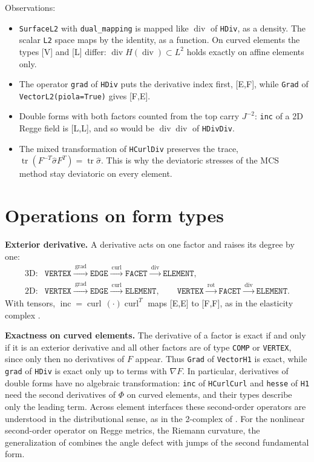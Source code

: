 \documentclass[10pt,a4paper]{article}
\newcommand{\code}[1]{\texttt{#1}}
\newcommand{\VV}{\textsf{V}}
\newcommand{\EE}{\textsf{E}}
\newcommand{\FF}{\textsf{F}}
\newcommand{\LL}{\textsf{L}}
\begin{document}
Observations:
\begin{itemize}\setlength\itemsep{1pt}
\item \code{SurfaceL2} with \code{dual\_mapping} is mapped like $\operatorname{div}$ of \code{HDiv}, as a density. The scalar \code{L2} space maps by the identity, as a function. On curved elements the types [\VV] and [\LL] differ: $\operatorname{div} H(\operatorname{div}) \subset L^2$ holds exactly on affine elements only.
\item The operator \code{grad} of \code{HDiv} puts the derivative index first, [\EE,\FF], while \code{Grad} of \code{VectorL2(piola=True)} gives [\FF,\EE].
\item Double forms with both factors counted from the top carry $J^{-2}$: \code{inc} of a 2D Regge field is [\LL,\LL], and so would be $\operatorname{div}\operatorname{div}$ of \code{HDivDiv}.
\item The mixed transformation of \code{HCurlDiv} preserves the trace, $\operatorname{tr}(F^{-T}\hat\sigma F^T) = \operatorname{tr}\hat\sigma$. This is why the deviatoric stresses of the MCS method \cite{gls1} stay deviatoric on every element.
\end{itemize}

\section{Operations on form types}

\textbf{Exterior derivative.} A derivative acts on one factor and raises its degree by one:
\[
\begin{array}{ll}
\text{3D:} & \code{VERTEX} \xrightarrow{\ \operatorname{grad}\ } \code{EDGE} \xrightarrow{\ \operatorname{curl}\ } \code{FACET} \xrightarrow{\ \operatorname{div}\ } \code{ELEMENT}, \\[2pt]
\text{2D:} & \code{VERTEX} \xrightarrow{\ \operatorname{grad}\ } \code{EDGE} \xrightarrow{\ \operatorname{curl}\ } \code{ELEMENT}, \qquad
             \code{VERTEX} \xrightarrow{\ \operatorname{rot}\ } \code{FACET} \xrightarrow{\ \operatorname{div}\ } \code{ELEMENT}.
\end{array}
\]
With tensors, $\operatorname{inc} = \operatorname{curl}\,(\cdot)\operatorname{curl}^T$ maps [\EE,\EE] to [\FF,\FF], as in the elasticity complex \cite{ah21}.

\textbf{Exactness on curved elements.} The derivative of a factor is exact if and only if it is an exterior derivative and all other factors are of type \code{COMP} or \code{VERTEX}, since only then no derivatives of $F$ appear. Thus \code{Grad} of \code{VectorH1} is exact, while \code{grad} of \code{HDiv} is exact only up to terms with $\nabla F$. In particular, derivatives of double forms have no algebraic transformation: \code{inc} of \code{HCurlCurl} and \code{hesse} of \code{H1} need the second derivatives of $\Phi$ on curved elements, and their types describe only the leading term. Across element interfaces these second-order operators are understood in the distributional sense, as in the 2-complex of \cite{ghs25}. For the nonlinear second-order operator on Regge metrics, the Riemann curvature, the generalization of \cite{gnsw} combines the angle defect with jumps of the second fundamental form.
\end{document}

